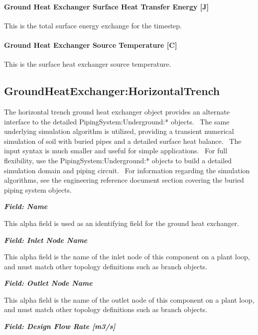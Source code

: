 \paragraph{Ground Heat Exchanger Surface Heat Transfer Energy {[}J{]}}\label{ground-heat-exchanger-surface-heat-transfer-energy-j}

This is the total surface energy exchange for the timestep.

\paragraph{Ground Heat Exchanger Source Temperature {[}C{]}}\label{ground-heat-exchanger-source-temperature-c}

This is the surface heat exchanger source temperature.

\subsection{GroundHeatExchanger:HorizontalTrench}\label{groundheatexchangerhorizontaltrench}

The horizontal trench ground heat exchanger object provides an alternate interface to the detailed PipingSystem:Underground:* objects.~ The same underlying simulation algorithm is utilized, providing a transient numerical simulation of soil with buried pipes and a detailed surface heat balance.~ The input syntax is much smaller and useful for simple applications.~ For full flexibility, use the PipingSystem:Underground:* objects to build a detailed simulation domain and piping circuit.~ For information regarding the simulation algorithms, see the engineering reference document section covering the buried piping system objects.

\textbf{\emph{Field: Name}}

This alpha field is used as an identifying field for the ground heat exchanger.

\textbf{\emph{Field: Inlet Node Name}}

This alpha field is the name of the inlet node of this component on a plant loop, and must match other topology definitions such as branch objects.

\textbf{\emph{Field: Outlet Node Name}}

This alpha field is the name of the outlet node of this component on a plant loop, and must match other topology definitions such as branch objects.

\textbf{\emph{Field: Design Flow Rate {[}m3/s{]}}}

